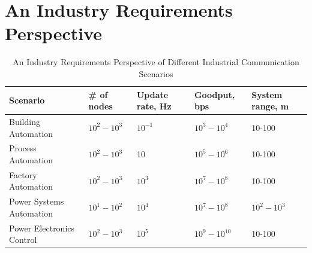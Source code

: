 \section{An Industry Requirements Perspective}\label{sec:litreview:industry}

\begin{table}[!tb]
	\centering
	\caption{An Industry Requirements Perspective of Different Industrial Communication Scenarios}
	\label{soa:industry-reqts-persp}%
	
\begin{tabular}{|p{7.5em}|p{4.215em}|p{4.215em}|p{4.215em}|p{4.215em}|}
	\toprule
	\textbf{Scenario} & \textbf{\# of nodes} & \textbf{Update rate, Hz} & \textbf{Goodput, bps} & \textbf{System range, m} \\
	\midrule
	Building Automation & $10^{2}-10^{3}$ & $10^{-1}$ & $10^{3}-10^{4}$ & 10-100 \\
	\midrule
	Process Automation & $10^{2}-10^{3}$ & \multicolumn{1}{l|}{10} & $10^{5}-10^{6}$ & 10-100 \\
	\midrule
	Factory Automation & $10^{2}-10^{3}$ & $10^{3}$ & $10^{7}-10^{8}$ & 10-100 \\
	\midrule
	Power Systems Automation & $10^{1}-10^{2}$ & $10^{4}$ & $10^{7}-10^{8}$ & $10^{2}-10^{3}$ \\
	\midrule
	Power Electronics Control & $10^{2}-10^{3}$ & $10^{5}$ & $10^{9}-10^{10}$ & 10-100 \\
	\bottomrule
\end{tabular}%

	
\end{table}%

